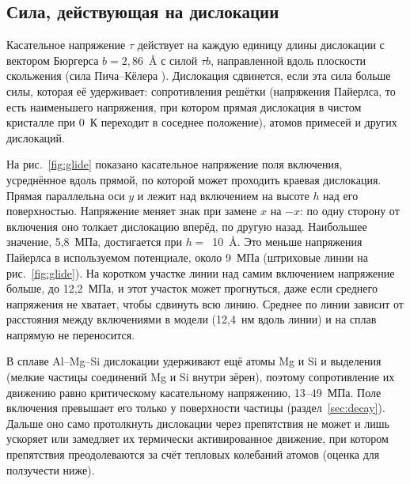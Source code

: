 \documentclass[11pt,a4paper]{article}
\begin{document}
\subsection{Сила, действующая на дислокации}

Касательное напряжение $\tau$ действует на каждую единицу длины
дислокации с вектором Бюргерса $b=2{,}86$~\AA{} с силой $\tau b$,
направленной вдоль плоскости скольжения (сила Пича--Кёлера
\cite{HirthLothe1982}). Дислокация сдвинется, если эта сила больше
силы, которая её удерживает: сопротивления решётки (напряжения Пайерлса,
то есть наименьшего напряжения, при котором прямая дислокация в чистом
кристалле при 0~К переходит в соседнее положение), атомов примесей и других
дислокаций.

На рис.~\ref{fig:glide} показано касательное напряжение поля включения,
усреднённое вдоль прямой, по которой может проходить краевая дислокация.
Прямая параллельна оси $y$ и лежит над включением на высоте $h$ над
его поверхностью. Напряжение
меняет знак при замене $x$ на $-x$: по одну сторону от включения оно
толкает дислокацию вперёд, по другую назад. Наибольшее значение, 5{,}8~МПа,
достигается при $h=$~10~\AA. Это меньше напряжения Пайерлса
в используемом потенциале, около 9~МПа (штриховые линии на
рис.~\ref{fig:glide}). На коротком участке линии над самим включением
напряжение больше, до 12{,}2~МПа, и этот участок может прогнуться,
даже если среднего напряжения не хватает, чтобы сдвинуть всю линию.
Среднее по линии зависит от расстояния между включениями в модели
(12{,}4~нм вдоль линии) и на сплав напрямую не переносится.

В сплаве Al--Mg--Si дислокации удерживают ещё атомы Mg и Si и выделения
(мелкие частицы соединений Mg и Si внутри зёрен), поэтому сопротивление
их движению равно критическому касательному напряжению, 13--49~МПа.
Поле включения превышает его только у поверхности частицы
(раздел~\ref{sec:decay}). Дальше оно само протолкнуть дислокации через
препятствия не может и лишь ускоряет или замедляет их термически
активированное движение, при котором препятствия преодолеваются за счёт
тепловых колебаний атомов (оценка для ползучести ниже).
\end{document}
